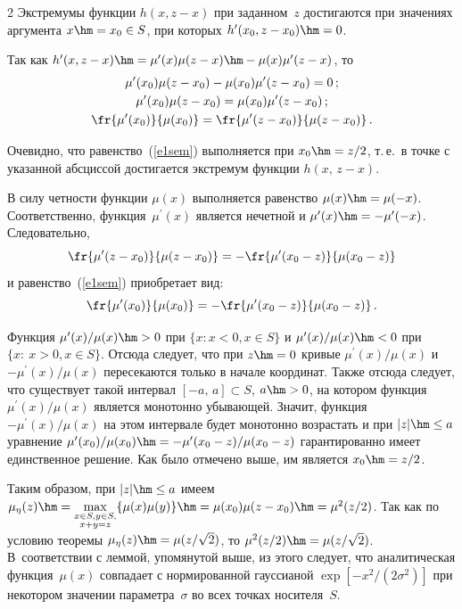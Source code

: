 \begin{multicols}{2}
  Экстремумы функции $h(x,z-x)$ при заданном~$z$ достигаются при 
значениях аргумента $x\hm=x_0\in S$, при которых $h^\prime (x_0,z-
x_0)\hm=0$.
  
  Так как $h^\prime(x,z-x)\hm=\mu^\prime(x)\mu(z-x)\hm - \mu(x) 
\mu^{\prime}(z-x)$, то
\begin{gather}
  \mu^\prime(x_0) \mu(z-x_0) -\mu(x_0)\mu^\prime(z-x_0)=0\,;\notag\\
  \mu^\prime(x_0)\mu(z-x_0)=\mu(x_0)\mu^\prime (z-x_0)\,;\notag\\
  \fr{\mu^\prime(x_0)}{\mu(x_0)}=\fr{\mu^\prime(z-x_0)}{\mu(z-x_0)}\,.
  \label{e1sem}
  \end{gather}
  
  Очевидно, что равенство~(\ref{e1sem}) выполняется при $x_0\hm=z/2$, т.\,е.\ в точке с 
указанной абсциссой достигается экстремум функции $h(x,\,z-x)$.
  
  В силу четности функции $\mu(x)$ выполняется равенство $\mu(x)\hm=\mu(-
x)$. Соответственно, функция~$\mu^\prime(x)$ является нечетной и 
$\mu^\prime(x)\hm=-\mu^\prime(-x)$. Следовательно, 
$$
\fr{\mu^\prime(z-x_0)}{\mu(z-x_0)}= -\fr{\mu^\prime(x_0-z)}{\mu(x_0-z)}
$$ 
и  равенство~(\ref{e1sem}) приобретает вид:
  $$
  \fr{\mu^\prime(x_0)}{\mu(x_0)}= -\fr{\mu^\prime(x_0-z)}{\mu(x_0-z)}\,.
  $$
  
  Функция $\mu^\prime(x)/\mu(x)\hm>0$ при $\{x: x<0, x\in S\}$ и 
$\mu^\prime(x)/\mu(x)\hm<0$ при $\{x:\ x>0, x\in S\}$. Отсюда следует, что при 
$z\hm=0$ кривые $\mu^\prime(x)/\mu(x)$ и $-\mu^\prime(x)/\mu(x)$ 
пересекаются только в начале координат. Также отсюда следует, что 
существует такой интервал $[-a,\,a]\subset S$, $a\hm>0$, на котором функция 
$\mu^\prime(x)/\mu(x)$ является монотонно убывающей. Значит, функция 
$-\mu^\prime(x)/\mu(x)$ на этом интервале будет монотонно возрастать и при 
$\vert z \vert \hm\leq a$ уравнение ${\mu^\prime(x_0)}/{\mu(x_0)}\hm= -
{\mu^\prime(x_0-z)}/{\mu(x_0-z)}$ гарантированно имеет единственное 
решение. Как было отмечено выше, им является $x_0\hm=z/2$.
     
     Таким образом, при $\vert z\vert \hm\leq a$ имеем $\mu_\eta(z)\hm= 
\max\limits_{\substack{{x\in S, y\in S,}\\{x+y=z}}}\{ \mu(x)\mu(y)\}\hm= 
\mu(x_0)\mu(z-x_0)\hm= \mu^2(z/2)$. Так как по условию теоремы 
$\mu_\eta(z)\hm= \mu(z/\sqrt{2})$, то $\mu^2(z/2)\hm=\mu(z/\sqrt{2})$. 
В~соответствии с леммой, упомянутой выше, из этого следует, что 
аналитическая функция~$\mu(x)$ совпадает с нормированной гауссианой 
$\exp\left[ -x^2/(2\sigma^2)\right]$ при некотором значении параметра~$\sigma$ 
во всех точках носителя~$S$.
     

\end{multicols}
